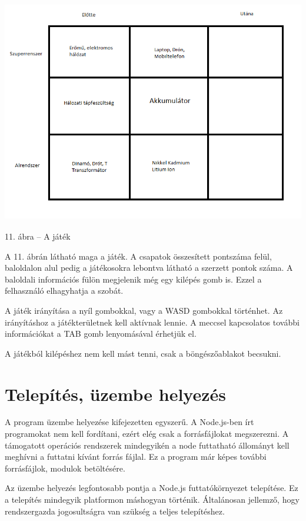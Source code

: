 \documentclass[bibliography=totocnumbered]{article}
\begin{document}
\includegraphics[width=5.90556in,height=3.82737in]{media/image8.png}

11. ábra -- A játék

A 11. ábrán látható maga a játék. A csapatok összesített pontszáma
felül, baloldalon alul pedig a játékosokra lebontva látható a szerzett
pontok száma. A baloldali információs fülön megjelenik még egy kilépés
gomb is. Ezzel a felhasználó elhagyhatja a szobát.

A játék irányítása a nyíl gombokkal, vagy a WASD gombokkal történhet. Az
irányításhoz a játékterületnek kell aktívnak lennie. A meccsel
kapcsolatos további információkat a TAB gomb lenyomásával érhetjük el.

A játékból kilépéshez nem kell mást tenni, csak a böngészőablakot
becsukni.


\section{Telepítés, üzembe
helyezés}

A program üzembe helyezése kifejezetten egyszerű. A Node.js-ben írt
programokat nem kell fordítani, ezért elég csak a forrásfájlokat
megszerezni. A támogatott operációs rendszerek mindegyikén a node
futtatható állományt kell meghívni a futtatni kívánt forrás fájlal. Ez a
program már képes további forrásfájlok, modulok betöltésére.

Az üzembe helyezés legfontosabb pontja a Node.js futtatókörnyezet
telepítése. Ez a telepítés mindegyik platformon máshogyan történik.
Általánosan jellemző, hogy rendszergazda jogosultságra van szükség a
teljes telepítéshez.
\end{document}
